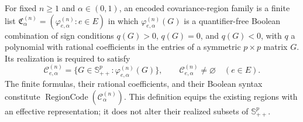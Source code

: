 For fixed \(n\geq1\) and \(\alpha\in(0,1)\), an encoded covariance-region family is a finite list \(\mathfrak C^{(n)}_\alpha=(\varphi^{(n)}_{e,\alpha}:e\in E)\) in which \(\varphi^{(n)}_{e,\alpha}(G)\) is a quantifier-free Boolean combination of sign conditions \(q(G)>0\), \(q(G)=0\), and \(q(G)<0\), with \(q\) a polynomial with rational coefficients in the entries of a symmetric \(p\times p\) matrix \(G\).  Its realization is required to satisfy
\[
 \mathcal C^{(n)}_{e,\alpha}
 =\{G\in\mathbb S_{++}^p:\varphi^{(n)}_{e,\alpha}(G)\},
 \qquad
 \mathcal C^{(n)}_{e,\alpha}\ne\varnothing
 \quad(e\in E).
\]
The finite formulas, their rational coefficients, and their Boolean syntax constitute \(\operatorname{RegionCode}(\mathcal C^{(n)}_\alpha)\).  This definition equips the existing regions with an effective representation; it does not alter their realized subsets of \(\mathbb S_{++}^p\).